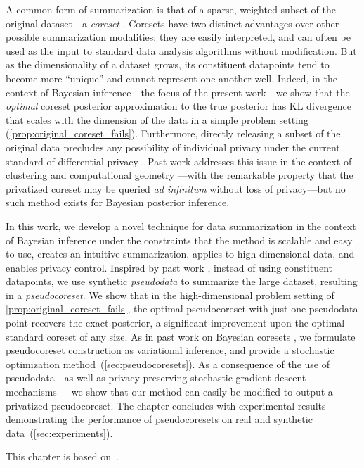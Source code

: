 A common form of summarization is that of a sparse, weighted subset of the original dataset---a \emph{coreset} \citep{agarwal05}. 
Coresets have two distinct advantages over other possible summarization modalities: they are easily interpreted, and can often be used
as the input to standard data analysis algorithms without modification. 
But as the dimensionality of a dataset grows, its constituent 
datapoints tend to become more ``unique'' and cannot represent one another well. Indeed, in the context of Bayesian inference---the focus of the
present work---we show that the \emph{optimal} coreset posterior approximation to the true posterior has KL divergence that scales with the dimension 
of the data in a simple problem setting (\cref{prop:original_coreset_fails}). 
Furthermore, directly releasing a subset of the original data precludes any possibility of
individual privacy under the current standard 
of differential privacy \citep{dwork2006calibrating,dwork14}. Past work
addresses this issue in the context of clustering and computational geometry \citep{feldman09,feldman17}---with
the remarkable property that the privatized coreset may be queried \emph{ad infinitum} without
loss of privacy---but no such method exists for Bayesian posterior inference.

In this work, we develop a novel technique for data summarization in the context of Bayesian inference under the constraints that the method 
is scalable and easy to use, creates an intuitive summarization, applies to high-dimensional data, and enables privacy control.
Inspired by past work \citep{madigan02,zhou08,snelson05}, instead of using constituent datapoints, we use synthetic \emph{pseudodata} to summarize the large dataset, resulting in a \emph{pseudocoreset}. We show that in the high-dimensional problem setting of \cref{prop:original_coreset_fails}, 
the optimal pseudocoreset with just one pseudodata point recovers the exact posterior, a significant improvement upon the optimal standard coreset of any size.
As in past work on Bayesian coresets \citep{campbell19neurips}, we formulate pseudocoreset construction as variational inference, 
and provide a stochastic optimization method~(\cref{sec:pseudocoresets}). As a consequence of the use of pseudodata---as well as privacy-preserving 
stochastic gradient descent mechanisms~\citep{abadi16,park16, jalko17}---we show that our method can easily be modified to output
a privatized pseudocoreset. The chapter concludes with experimental results demonstrating the performance of pseudocoresets on 
real and synthetic data~(\cref{sec:experiments}).

This chapter is based on~\citep{psvi}.
